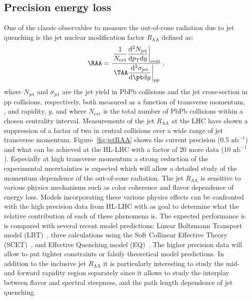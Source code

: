 \subsection{Precision energy loss}\label{sec:preceloss}
One of the classic observables to measure the out-of-cone radiation due to jet quenching is the jet nuclear modification factor $R_{\mathrm{AA}}$ defined as: 
  \begin{equation} 
  \RAA=\dfrac{ \left.\dfrac{1}{N_{\mathrm{evt}} }\dfrac{\mathrm{d}^{2} 
N_{\mathrm{jet}}}{\mathrm{d} \pT \mathrm{d} y} \right|_{\mathrm{cent}}
}
{
\left. \TAA \dfrac{\mathrm{d}^2 \sigma_{\mathrm{jet}}}{\mathrm{d} \pt \mathrm{d} y}\right|_{pp}
}\, ,
\label{eq:RAAjet}
\end{equation} 
where $N_{\mathrm{jet}}$ and $\sigma_{\mathrm{jet}}$ are the jet yield in PbPb collisions and the jet cross-section in pp collisions, 
respectively, both measured as a function of transverse momentum, \pT, and rapidity, $y$, and where $N_{\mathrm{evt}}$ is the total number of PbPb collisions within a chosen centrality interval. 
Measurements of the jet $R_{\mathrm{AA}}$ at the LHC have shown a suppression of a factor of two in central collisions over a wide range of jet transverse momentum. Figure~\ref{fig:jetRAA} shows the current precision (0.5 $\mathrm{nb}^{-1}$) and what can be achieved at the HL-LHC with a factor of 20 more data (10 $\mathrm{nb}^{-1}$). Especially at high transverse momentum a strong reduction of the experimental uncertainties is expected which will allow a detailed study of the momentum dependence of the out-of-cone radiation. The jet $R_{\mathrm{AA}}$ is sensitive to various physics mechanisms such as color coherence and flavor dependence of energy loss. Models incorporating these various physics effects can be confronted with the high precision data from HL-LHC with as goal to determine what the relative contribution of each of these phenomena is. The expected performance is is compared with several recent model predictions: Linear Boltzmann Transport model (LBT)~\cite{He:2015pra}, three calculations using the Soft Collinear Effective Theory (SCET)~\cite{Chien:2015vja,Chien:2015hda,Vitev:2008rz,Kang:2017frl}, and Effective Quenching model (EQ)~\cite{Spousta:2015fca}. The higher precision data will allow to put tighter constraints or falsify theoretical model predictions. In addition to the inclusive jet $R_{\mathrm{AA}}$ it is particularly interesting to study the mid- and forward rapidity region separately since it allows to study the interplay between flavor and spectral steepness, and the path length dependence of jet quenching. 
